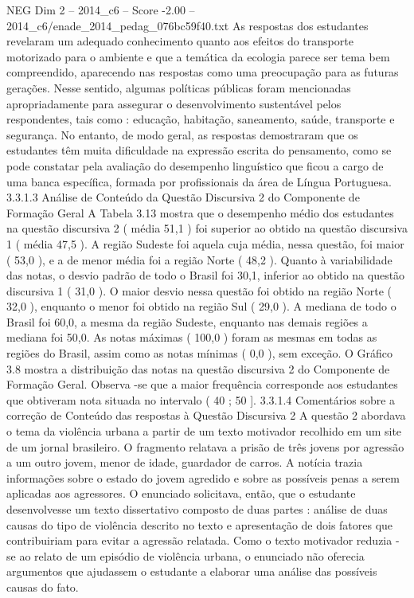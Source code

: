 \begin{textsample}{NEG Dim 2 – 2014\_c6 – Score -2.00 – 2014\_c6/enade\_2014\_pedag\_076bc59f40.txt}
As respostas dos estudantes revelaram um adequado conhecimento quanto aos efeitos do transporte motorizado para o ambiente e que a temática da ecologia parece ser tema bem compreendido, aparecendo nas respostas como uma preocupação para as futuras gerações.
Nesse sentido, algumas políticas públicas foram mencionadas apropriadamente para assegurar o desenvolvimento sustentável pelos respondentes, tais como : educação, habitação, saneamento, saúde, transporte e segurança.
No entanto, de modo geral, as respostas demostraram que os estudantes têm muita dificuldade na expressão escrita do pensamento, como se pode constatar pela avaliação do desempenho linguístico que ficou a cargo de uma banca específica, formada por profissionais da área de Língua Portuguesa. 3.3.1.3 Análise de Conteúdo da Questão Discursiva 2 do Componente de Formação Geral A Tabela 3.13 mostra que o desempenho médio dos estudantes na questão discursiva 2 ( média 51,1 ) foi superior ao obtido na questão discursiva 1 ( média 47,5 ).
A região Sudeste foi aquela cuja média, nessa questão, foi maior ( 53,0 ), e a de menor média foi a região Norte ( 48,2 ).
Quanto à variabilidade das notas, o desvio padrão de todo o Brasil foi 30,1, inferior ao obtido na questão discursiva 1 ( 31,0 ).
O maior desvio nessa questão foi obtido na região Norte ( 32,0 ), enquanto o menor foi obtido na região Sul ( 29,0 ).
A mediana de todo o Brasil foi 60,0, a mesma da região Sudeste, enquanto nas demais regiões a mediana foi 50,0.
As notas máximas ( 100,0 ) foram as mesmas em todas as regiões do Brasil, assim como as notas mínimas ( 0,0 ), sem exceção.
O Gráfico 3.8 mostra a distribuição das notas na questão discursiva 2 do Componente de Formação Geral.
Observa -se que a maior frequência corresponde aos estudantes que obtiveram nota situada no intervalo ( 40 ; 50 ]. 3.3.1.4 Comentários sobre a correção de Conteúdo das respostas à Questão Discursiva 2 A questão 2 abordava o tema da violência urbana a partir de um texto motivador recolhido em um site de um jornal brasileiro.
O fragmento relatava a prisão de três jovens por agressão a um outro jovem, menor de idade, guardador de carros.
A notícia trazia informações sobre o estado do jovem agredido e sobre as possíveis penas a serem aplicadas aos agressores.
O enunciado solicitava, então, que o estudante desenvolvesse um texto dissertativo composto de duas partes : análise de duas causas do tipo de violência descrito no texto e apresentação de dois fatores que contribuiriam para evitar a agressão relatada.
Como o texto motivador reduzia -se ao relato de um episódio de violência urbana, o enunciado não oferecia argumentos que ajudassem o estudante a elaborar uma análise das possíveis causas do fato.

\end{textsample}
